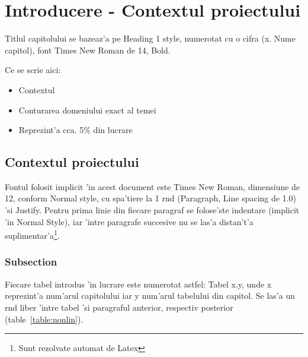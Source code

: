 \documentclass[12pt,a4paper,twoside]{report}
\begin{document}


 

\newpage

\tableofcontents
\newpage



\chapter{Introducere - Contextul proiectului}
\pagestyle{headings}

Titlul capitolului se bazeaz'a pe Heading 1 style, numerotat cu o cifra (x. Nume capitol), font Times New Roman de 14, Bold.

Ce se scrie aici:

\begin{itemize}
 \item Contextul
\item Conturarea domeniului exact al temei
\item Reprezint'a cca. 5\% din lucrare
\end{itemize}


\section{Contextul proiectului}

Fontul folosit implicit 'in acest document este Times New Roman, dimensiune de 12, conform Normal style, cu spa'tiere la 1 r\ia nd (Paragraph, Line spacing de 1.0) 'si Justify. 
Pentru prima linie din fiecare paragraf se folose'ste indentare (implicit 'in Normal Style), iar 'intre paragrafe succesive nu se las'a distan't'a suplimentar'a\footnote{Sunt rezolvate automat de Latex}.

\subsection{Subsection}
Fiecare tabel introdus 'in lucrare este numerotat astfel: Tabel x.y, unde x reprezint'a num'arul capitolului iar y num'arul tabelului din capitol. 
Se las'a un r\ia nd liber 'intre tabel 'si paragraful anterior, respectiv posterior (table~\ref{table:nonlin}).
\end{document}
